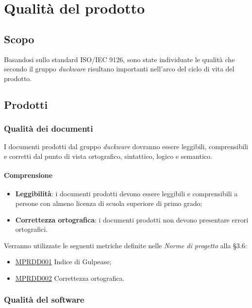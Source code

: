 \clearpage
\section{Qualità del prodotto}
\label{sec:qualita_prodotto}
\subsection{Scopo}
\label{sec:qualita_prodotto_scopo}
Basandosi sullo standard ISO/IEC 9126, sono state individuate le qualità che secondo il gruppo \emph{duckware} risultano importanti nell'arco del ciclo di vita del prodotto.
\subsection{Prodotti}
\subsubsection{Qualità dei documenti}
\label{sec:qualita_documenti}
I documenti prodotti dal gruppo \emph{duckware} dovranno essere leggibili, comprensibili e corretti dal punto di vista ortografico, sintattico, logico e semantico.
\paragraph{Comprensione}
\begin{itemize}
	\item \textbf{Leggibilità}: i documenti prodotti devono essere leggibili e comprensibili a persone con almeno licenza di scuola superiore di primo grado;
	\item \textbf{Correttezza ortografica}: i documenti prodotti non devono presentare errori ortografici.
\end{itemize}
Verranno utilizzate le seguenti metriche definite nelle \textit{Norme di progetto} alla §3.6:
\begin{itemize}
	\item \hyperref[sec:qprodotto_tabella_metriche_obiettivi]{MPRDD001} Indice di Gulpease;
	\item \hyperref[sec:qprodotto_tabella_metriche_obiettivi]{MPRDD002} Correttezza ortografica.
\end{itemize}
\subsubsection{Qualità del software}
\label{sec:qualita_software_parag}
